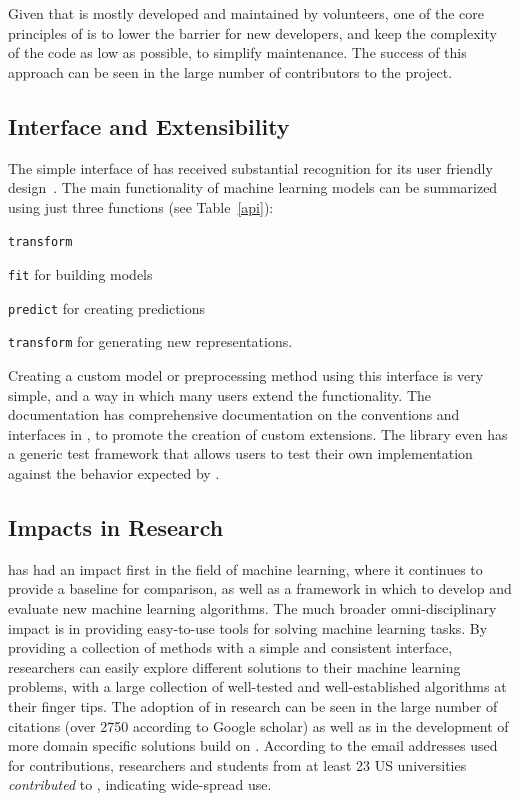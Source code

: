 Given that \sklearn{} is mostly developed and maintained by volunteers,
one of the core principles of \sklearn{} is to lower the barrier for new developers,
and keep the complexity of the code as low as possible, to simplify maintenance.
The success of this approach can be seen in the large number of contributors to
the project.

\subsection{Interface and Extensibility}
The simple interface of \sklearn{} has received substantial
recognition for its user friendly design~\cite{benlorica, testimonials}.
The main functionality of machine learning models can
be summarized using just three functions (see Table~\ref{api}):
\begin{labeling}{\texttt{transform}}
    \item[\texttt{fit}] for building models
    \item[\texttt{predict}] for creating predictions
    \item[\texttt{transform}] for generating new representations.
\end{labeling}
Creating a custom model or preprocessing method using this interface is very simple,
and a way in which many users extend the functionality. The \sklearn{} documentation
has comprehensive documentation on the conventions and interfaces in \sklearn{},
to promote the creation of custom extensions.
The \sklearn{} library even has a generic test framework that allows users to
test their own implementation against the behavior expected by \sklearn{}.

\subsection{Impacts in Research}
\sklearn{} has had an impact first in the field of machine learning,
where it continues to provide a baseline for comparison, as well as a
framework in which to develop and evaluate new machine learning algorithms.
The much broader omni-disciplinary impact is in providing easy-to-use
tools for solving machine learning tasks. By providing a collection
of methods with a simple and consistent interface, researchers
can easily explore different solutions to their machine learning problems,
with a large collection of well-tested and well-established algorithms
at their finger tips.
The adoption of \sklearn{} in research can be seen in the large number
of citations (over 2750 according to Google scholar) as well as in the development
of more domain specific solutions build on \sklearn{}.
According to the email addresses used for contributions, researchers and students
from at least 23 US universities \emph{contributed} to \sklearn{}, indicating wide-spread use.

